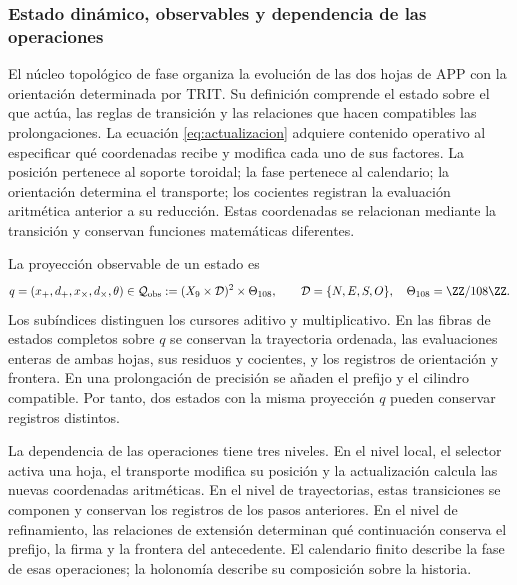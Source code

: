
\subsubsection{Estado dinámico, observables y dependencia de las operaciones}
\label{tpk-int:estado}

El núcleo topológico de fase organiza la evolución de las dos hojas de APP
con la orientación determinada por TRIT. Su definición comprende el estado
sobre el que actúa, las reglas de transición y las relaciones que hacen
compatibles las prolongaciones. La ecuación \eqref{eq:actualizacion} adquiere
contenido operativo al especificar qué coordenadas recibe y modifica cada
uno de sus factores. La posición pertenece al soporte toroidal; la fase
pertenece al calendario; la orientación determina el transporte; los
cocientes registran la evaluación aritmética anterior a su reducción.
Estas coordenadas se relacionan mediante la transición y conservan funciones
matemáticas diferentes.

La proyección observable de un estado es
\begin{equation}
 q=(x_+,d_+,x_\times,d_\times,\theta)
 \in\mathcal Q_{\rm obs}
 :=(X_9\times\mathcal D)^2\times\Theta_{108},
 \qquad \mathcal D=\{N,E,S,O\},\quad
 \Theta_{108}=\ZZ/108\ZZ.
 \label{tpk-int:qobs}
\end{equation}
Los subíndices distinguen los cursores aditivo y multiplicativo. En las
fibras de estados completos sobre \(q\) se conservan la trayectoria ordenada, las evaluaciones
enteras de ambas hojas, sus residuos y cocientes, y los registros de
orientación y frontera. En una prolongación de precisión se añaden el
prefijo y el cilindro compatible. Por tanto, dos estados con la misma
proyección \(q\) pueden conservar registros distintos.

La dependencia de las operaciones tiene tres niveles. En el nivel local,
el selector activa una hoja, el transporte modifica su posición y la
actualización calcula las nuevas coordenadas aritméticas. En el nivel de
trayectorias, estas transiciones se componen y conservan los registros de
los pasos anteriores. En el nivel de refinamiento, las relaciones de
extensión determinan qué continuación conserva el prefijo, la firma y la
frontera del antecedente. El calendario finito describe la fase de esas
operaciones; la holonomía describe su composición sobre la historia.

